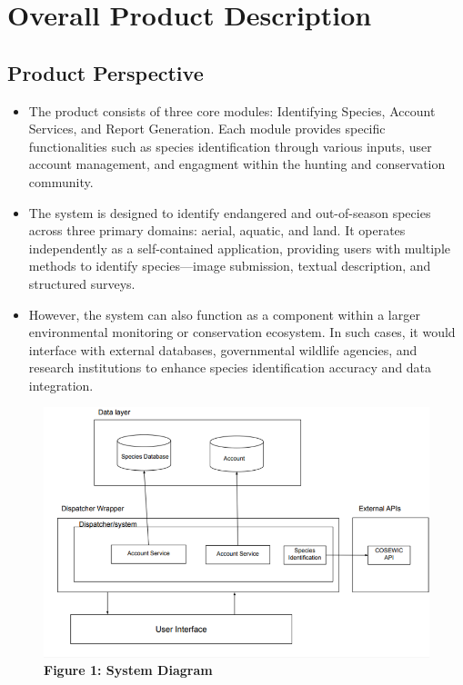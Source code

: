 \documentclass[]{article}
\begin{document}

\section{Overall Product Description}
\label{sec:overall_description}
\subsection{Product Perspective}
\label{sub:product_perspective}
\begin{itemize}

	\item The product consists of three core modules: Identifying Species, Account Services, and Report Generation. Each module provides specific functionalities such as species identification through various inputs, user account management, and engagment within the hunting and conservation community.

	\item The system is designed to identify endangered and out-of-season species across three primary domains: aerial, aquatic, and land. It operates independently as a self-contained application, providing users with multiple methods to identify species—image submission, textual description, and structured surveys.

	\item However, the system can also function as a component within a larger environmental monitoring or conservation ecosystem. In such cases, it would interface with external databases, governmental wildlife agencies, and research institutions to enhance species identification accuracy and data integration.

\end{itemize}
\begin{figure}[h]
    \centering
    \includegraphics[scale=0.5]{figure1.png}
    \caption*{\textbf{Figure 1: System Diagram}} %
\end{figure}
\end{document}

